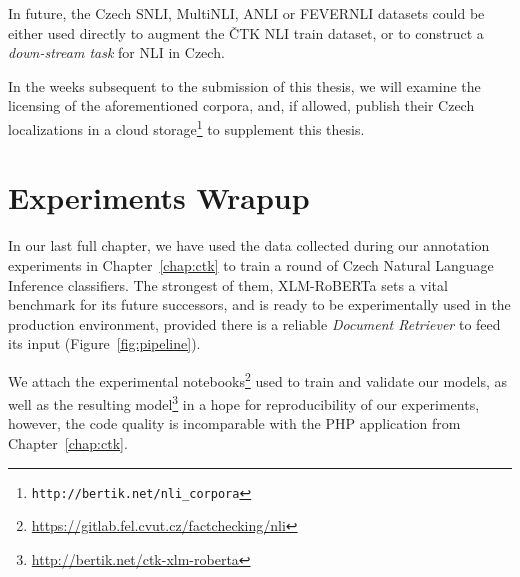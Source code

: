 In future, the Czech \textsf{SNLI}, \textsf{MultiNLI}, \textsf{ANLI} or \textsf{FEVERNLI} datasets could be either used directly to augment the \textsf{ČTK NLI train} dataset, or to construct a \textit{down-stream task} for NLI in Czech.

In the weeks subsequent to the submission of this thesis, we will examine the licensing of the aforementioned corpora, and, if allowed, publish their Czech localizations in a cloud storage\footnote{\texttt{http://bertik.net/nli\_corpora}} to supplement this thesis.


\section{Experiments Wrapup}
In our last full chapter, we have used the data collected during our annotation experiments in Chapter~\ref{chap:ctk} to train a round of Czech Natural Language Inference classifiers. The strongest of them, \textsf{XLM-RoBERTa} sets a vital benchmark for its future successors, and is ready to be experimentally used in the production environment, provided there is a reliable \textit{Document Retriever} to feed its input (Figure~\ref{fig:pipeline}).

We attach the experimental notebooks\footnote{\url{https://gitlab.fel.cvut.cz/factchecking/nli}} used to train and validate our models, as well as the resulting model\footnote{\url{http://bertik.net/ctk-xlm-roberta}} in a hope for reproducibility of our experiments, however, the code quality is incomparable with the PHP application from Chapter~\ref{chap:ctk}.
